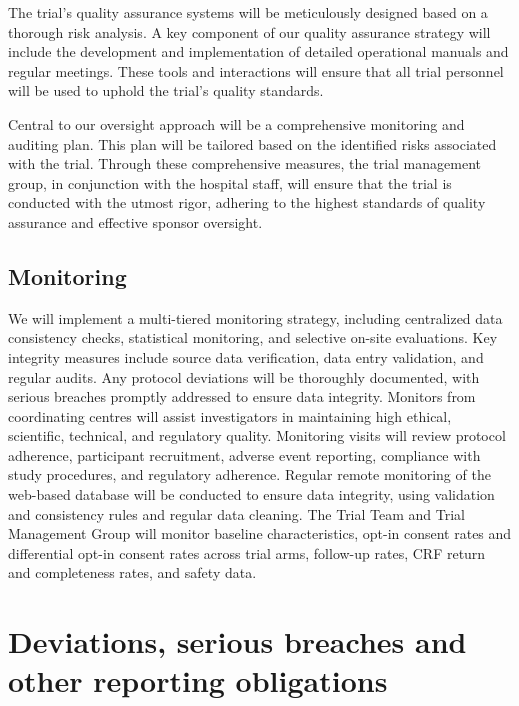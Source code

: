 \documentclass[
]{scrartcl}
\begin{document}
The trial's quality assurance systems will be meticulously designed
based on a thorough risk analysis. A key component of our quality
assurance strategy will include the development and implementation of
detailed operational manuals and regular meetings. These tools and
interactions will ensure that all trial personnel will be used to uphold
the trial's quality standards.

Central to our oversight approach will be a comprehensive monitoring and
auditing plan. This plan will be tailored based on the identified risks
associated with the trial. Through these comprehensive measures, the
trial management group, in conjunction with the hospital staff, will
ensure that the trial is conducted with the utmost rigor, adhering to
the highest standards of quality assurance and effective sponsor
oversight.

\hypertarget{monitoring}{%
\subsection{Monitoring}\label{monitoring}}

We will implement a multi-tiered monitoring strategy, including
centralized data consistency checks, statistical monitoring, and
selective on-site evaluations. Key integrity measures include source
data verification, data entry validation, and regular audits. Any
protocol deviations will be thoroughly documented, with serious breaches
promptly addressed to ensure data integrity. Monitors from coordinating
centres will assist investigators in maintaining high ethical,
scientific, technical, and regulatory quality. Monitoring visits will
review protocol adherence, participant recruitment, adverse event
reporting, compliance with study procedures, and regulatory adherence.
Regular remote monitoring of the web-based database will be conducted to
ensure data integrity, using validation and consistency rules and
regular data cleaning. The Trial Team and Trial Management Group will
monitor baseline characteristics, opt-in consent rates and differential
opt-in consent rates across trial arms, follow-up rates, CRF return and
completeness rates, and safety data.

\hypertarget{deviations-serious-breaches-and-other-reporting-obligations}{%
\section{Deviations, serious breaches and other reporting
obligations}\label{deviations-serious-breaches-and-other-reporting-obligations}}
\end{document}
